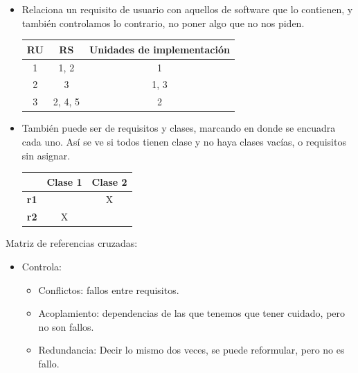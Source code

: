 \documentclass[12pt, twoside, openright]{report} %
\begin{document}
\begin{itemize}
	\item Relaciona un requisito de usuario con aquellos de software que lo
	      contienen, y también controlamos lo contrario, no poner algo que no
	      nos piden.

	      \begin{table}[h]
		      \begin{tabular}{|c|c|c|}
			      \hline
			      \textbf{RU} & \textbf{RS} & \textbf{Unidades de implementación} \\ \hline
			      1           & 1, 2        & 1                                   \\ \hline
			      2           & 3           & 1, 3                                \\ \hline
			      3           & 2, 4, 5     & 2                                   \\ \hline
		      \end{tabular}
	      \end{table}
	\item También puede ser de requisitos y clases, marcando en donde se
	      encuadra cada uno. Así se ve si todos tienen clase y no haya clases
	      vacías, o requisitos sin asignar.

	      \begin{table}[h]
		      \begin{tabular}{c|c|c|}
			      \cline{2-3}
			                                        & \textbf{Clase 1} & \textbf{Clase 2} \\ \hline
			      \multicolumn{1}{|c|}{\textbf{r1}} &                  & X                \\ \hline
			      \multicolumn{1}{|c|}{\textbf{r2}} & X                &                  \\ \hline
		      \end{tabular}
	      \end{table}

\end{itemize}
Matriz de referencias cruzadas:

\begin{itemize}
	\item Controla:

	      \begin{itemize}
		      \item Conflictos: fallos entre requisitos.
		      \item Acoplamiento: dependencias de las que tenemos que tener cuidado,
		            pero no son fallos.
		      \item Redundancia: Decir lo mismo dos veces, se puede reformular, pero
		            no es fallo.
	      \end{itemize}
\end{itemize}
\end{document}
